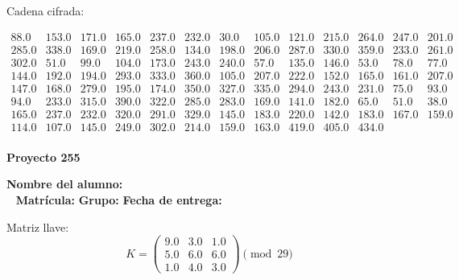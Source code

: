 \documentclass[12pt]{article}
\begin{document}
Cadena cifrada:
\begin{center}
$\begin{array}{lllllllllllll}
88.0 & 153.0 & 171.0 & 165.0 & 237.0 & 232.0 & 30.0 & 105.0 & 121.0 & 215.0 & 264.0 & 247.0 & 201.0\\
285.0 & 338.0 & 169.0 & 219.0 & 258.0 & 134.0 & 198.0 & 206.0 & 287.0 & 330.0 & 359.0 & 233.0 & 261.0\\
302.0 & 51.0 & 99.0 & 104.0 & 173.0 & 243.0 & 240.0 & 57.0 & 135.0 & 146.0 & 53.0 & 78.0 & 77.0\\
144.0 & 192.0 & 194.0 & 293.0 & 333.0 & 360.0 & 105.0 & 207.0 & 222.0 & 152.0 & 165.0 & 161.0 & 207.0\\
147.0 & 168.0 & 279.0 & 195.0 & 174.0 & 350.0 & 327.0 & 335.0 & 294.0 & 243.0 & 231.0 & 75.0 & 93.0\\
94.0 & 233.0 & 315.0 & 390.0 & 322.0 & 285.0 & 283.0 & 169.0 & 141.0 & 182.0 & 65.0 & 51.0 & 38.0\\
165.0 & 237.0 & 232.0 & 320.0 & 291.0 & 329.0 & 145.0 & 183.0 & 220.0 & 142.0 & 183.0 & 167.0 & 159.0\\
114.0 & 107.0 & 145.0 & 249.0 & 302.0 & 214.0 & 159.0 & 163.0 & 419.0 & 405.0 & 434.0\\
\end{array}$
\end{center}

\newpage


\textbf{Proyecto 255}

\textbf{Nombre del alumno:} \underline{\hspace{13cm}}\\\
\vspace{1cm}
\textbf{Matrícula:} \underline{\hspace{4cm}} \hspace{1cm}
\textbf{Grupo:} \underline{\hspace{2cm}}
\textbf{Fecha de entrega:} \underline{\hspace{2cm}}

\medskip

Matriz llave:
\[
K = \begin{pmatrix}
9.0 & 3.0 & 1.0\\
5.0 & 6.0 & 6.0\\
1.0 & 4.0 & 3.0
\end{pmatrix} \pmod{29}
\]
\end{document}

